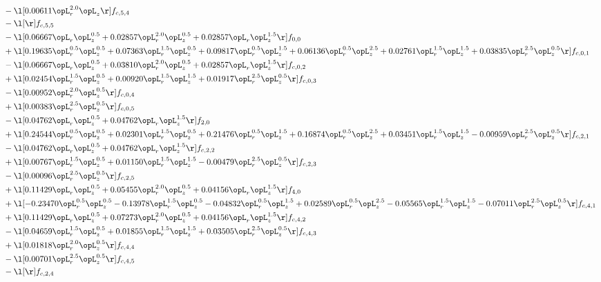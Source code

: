 \begin{alignat}{2}
& - \l[  0.00611 \opL_r^{2.0} \opL_z  \r] f_{c,5,4} \nonumber \\ 
& - \l[  \r] f_{c,5,5} \nonumber \\ 
& - \l[  0.06667 \opL_r \opL_z^{0.5} +  0.02857 \opL_r^{2.0} \opL_z^{0.5} +  0.02857 \opL_r \opL_z^{1.5}  \r] f_{0,0} \nonumber \\ 
& + \l[  0.19635 \opL_r^{0.5} \opL_z^{0.5} +  0.07363 \opL_r^{1.5} \opL_z^{0.5} +  0.09817 \opL_r^{0.5} \opL_z^{1.5} +  0.06136 \opL_r^{0.5} \opL_z^{2.5} +  0.02761 \opL_r^{1.5} \opL_z^{1.5} +  0.03835 \opL_r^{2.5} \opL_z^{0.5}  \r] f_{c,0,1} \nonumber \\ 
& - \l[  0.06667 \opL_r \opL_z^{0.5} +  0.03810 \opL_r^{2.0} \opL_z^{0.5} +  0.02857 \opL_r \opL_z^{1.5}  \r] f_{c,0,2} \nonumber \\ 
& + \l[  0.02454 \opL_r^{1.5} \opL_z^{0.5} +  0.00920 \opL_r^{1.5} \opL_z^{1.5} +  0.01917 \opL_r^{2.5} \opL_z^{0.5}  \r] f_{c,0,3} \nonumber \\ 
& - \l[  0.00952 \opL_r^{2.0} \opL_z^{0.5}  \r] f_{c,0,4} \nonumber \\ 
& + \l[  0.00383 \opL_r^{2.5} \opL_z^{0.5}  \r] f_{c,0,5} \nonumber \\ 
& - \l[  0.04762 \opL_r \opL_z^{0.5} +  0.04762 \opL_r \opL_z^{1.5}  \r] f_{2,0} \nonumber \\ 
& + \l[  0.24544 \opL_r^{0.5} \opL_z^{0.5} +  0.02301 \opL_r^{1.5} \opL_z^{0.5} +  0.21476 \opL_r^{0.5} \opL_z^{1.5} +  0.16874 \opL_r^{0.5} \opL_z^{2.5} +  0.03451 \opL_r^{1.5} \opL_z^{1.5}   -0.00959 \opL_r^{2.5} \opL_z^{0.5}  \r] f_{c,2,1} \nonumber \\ 
& - \l[  0.04762 \opL_r \opL_z^{0.5} +  0.04762 \opL_r \opL_z^{1.5}  \r] f_{c,2,2} \nonumber \\ 
& + \l[  0.00767 \opL_r^{1.5} \opL_z^{0.5} +  0.01150 \opL_r^{1.5} \opL_z^{1.5}   -0.00479 \opL_r^{2.5} \opL_z^{0.5}  \r] f_{c,2,3} \nonumber \\ 
& - \l[  0.00096 \opL_r^{2.5} \opL_z^{0.5}  \r] f_{c,2,5} \nonumber \\ 
& + \l[  0.11429 \opL_r \opL_z^{0.5} +  0.05455 \opL_r^{2.0} \opL_z^{0.5} +  0.04156 \opL_r \opL_z^{1.5}  \r] f_{4,0} \nonumber \\ 
& + \l[  -0.23470 \opL_r^{0.5} \opL_z^{0.5}   -0.13978 \opL_r^{1.5} \opL_z^{0.5}   -0.04832 \opL_r^{0.5} \opL_z^{1.5} +  0.02589 \opL_r^{0.5} \opL_z^{2.5}   -0.05565 \opL_r^{1.5} \opL_z^{1.5}   -0.07011 \opL_r^{2.5} \opL_z^{0.5}  \r] f_{c,4,1} \nonumber \\ 
& + \l[  0.11429 \opL_r \opL_z^{0.5} +  0.07273 \opL_r^{2.0} \opL_z^{0.5} +  0.04156 \opL_r \opL_z^{1.5}  \r] f_{c,4,2} \nonumber \\ 
& - \l[  0.04659 \opL_r^{1.5} \opL_z^{0.5} +  0.01855 \opL_r^{1.5} \opL_z^{1.5} +  0.03505 \opL_r^{2.5} \opL_z^{0.5}  \r] f_{c,4,3} \nonumber \\ 
& + \l[  0.01818 \opL_r^{2.0} \opL_z^{0.5}  \r] f_{c,4,4} \nonumber \\ 
& - \l[  0.00701 \opL_r^{2.5} \opL_z^{0.5}  \r] f_{c,4,5} \nonumber \\ 
& - \l[  \r] f_{c,2,4} \nonumber \\ 
\end{alignat} 


